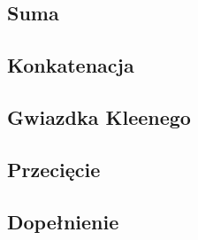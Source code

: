 \subsection{Suma}


\subsection{Konkatenacja}


\subsection{Gwiazdka Kleenego}


\subsection{Przecięcie}


\subsection{Dopełnienie}
